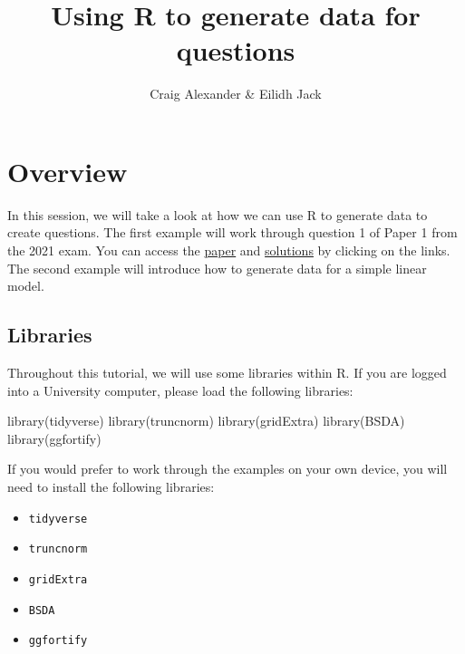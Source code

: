 \documentclass[
]{book}
\title{Using R to generate data for questions}
\author{Craig Alexander \& Eilidh Jack}
\date{}
\newenvironment{Shaded}{\begin{snugshade}}{\end{snugshade}}
\newcommand{\FunctionTok}[1]{\textcolor[rgb]{0.00,0.00,0.00}{#1}}
\newcommand{\NormalTok}[1]{#1}
\providecommand{\tightlist}{%
  \setlength{\itemsep}{0pt}\setlength{\parskip}{0pt}}
\begin{document}
\maketitle

{
\setcounter{tocdepth}{1}
\tableofcontents
}
\hypertarget{overview}{%
\chapter{Overview}\label{overview}}

In this session, we will take a look at how we can use R to generate data to create questions. The first example will work through question 1 of Paper 1 from the 2021 exam. You can access the \href{https://www.sqa.org.uk/sqa/files_ccc/NAH_Statistics_Paper1_2021.pdf}{paper} and \href{https://www.sqa.org.uk/sqa/files_ccc/mi_NAH_Statistics-Paper-1_mi_2021.pdf}{solutions} by clicking on the links. The second example will introduce how to generate data for a simple linear model.

\hypertarget{libraries}{%
\section{Libraries}\label{libraries}}

Throughout this tutorial, we will use some libraries within R. If you are logged into a University computer, please load the following libraries:

\begin{Shaded}
\begin{Highlighting}[]
\FunctionTok{library}\NormalTok{(tidyverse)}
\FunctionTok{library}\NormalTok{(truncnorm)}
\FunctionTok{library}\NormalTok{(gridExtra)}
\FunctionTok{library}\NormalTok{(BSDA)}
\FunctionTok{library}\NormalTok{(ggfortify)}
\end{Highlighting}
\end{Shaded}

If you would prefer to work through the examples on your own device, you will need to install the following libraries:

\begin{itemize}
\tightlist
\item
  \texttt{tidyverse}
\item
  \texttt{truncnorm}
\item
  \texttt{gridExtra}
\item
  \texttt{BSDA}
\item
  \texttt{ggfortify}
\end{itemize}
\end{document}
